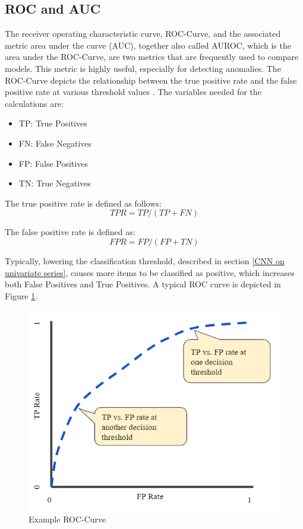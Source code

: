 \subsection{ROC and AUC} \label{AUROC}

The receiver operating characteristic curve, ROC-Curve, and the associated metric area under the curve (AUC), together also called AUROC, which is the area under the ROC-Curve, are two metrics that are frequently used to compare models. This metric is highly useful, especially for detecting anomalies. The ROC-Curve depicts the relationship between the true positive rate and the false positive rate at various threshold values \parencite{Google2021}. The variables needed for the calculations are:

\begin{itemize}
	\item TP: True Positives
	\item FN: False Negatives
	\item FP: False Positives
	\item TN: True Negatives	 
\end{itemize}

	
	The true positive rate is defined as follows: \[TPR = TP/(TP+FN)\]
	
	The false positive rate is defined as: \[FPR = FP/(FP+TN)\]

Typically, lowering the classification threshold, described in section \ref{CNN on univariate series}, causes more items to be classified as positive, which increases both False Positives and True Positives. A typical ROC curve is depicted in Figure \ref{fig:ROC}.

\begin{figure}[h]
	\centering
	\includegraphics[scale=00.4]{Figures/ROC}
	\decoRule
	\caption[Example ROC-Curve]{Example ROC-Curve \parencite{Google2021}}
	\label{fig:ROC}
\end{figure}

